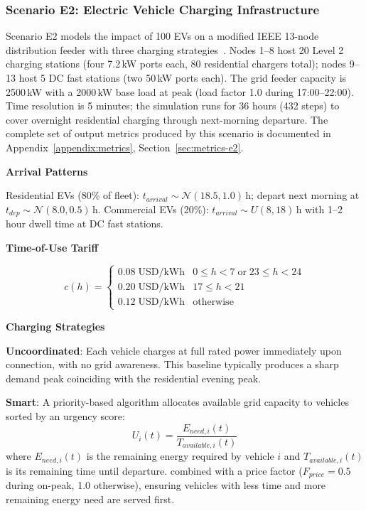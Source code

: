 \subsubsection{Scenario E2: Electric Vehicle Charging Infrastructure}
\label{sec:scenario-e2}

Scenario E2 models the impact of 100 EVs on a modified IEEE 13-node distribution feeder with three charging strategies~\cite{der_challenges}. Nodes 1--8 host 20 Level 2 charging stations (four 7.2\,kW ports each, 80 residential chargers total); nodes 9--13 host 5 DC fast stations (two 50\,kW ports each). The grid feeder capacity is 2500\,kW with a 2000\,kW base load at peak (load factor 1.0 during 17:00--22:00). Time resolution is 5 minutes; the simulation runs for 36 hours (432 steps) to cover overnight residential charging through next-morning departure. The complete set of output metrics produced by this scenario is documented in Appendix~\ref{appendix:metrics}, Section~\ref{sec:metrics-e2}.

\medskip\noindent\textbf{Arrival Patterns}

Residential EVs (80\% of fleet): $t_{arrival} \sim \mathcal{N}(18.5, 1.0)\,\text{h}$; depart next morning at $t_{dep} \sim \mathcal{N}(8.0, 0.5)\,\text{h}$. Commercial EVs (20\%): $t_{arrival} \sim U(8,18)\,\text{h}$ with 1--2 hour dwell time at DC fast stations.

\medskip\noindent\textbf{Time-of-Use Tariff}

\begin{equation}
c(h) = \begin{cases}
0.08\;\text{USD/kWh} & 0 \leq h < 7 \;\text{or}\; 23 \leq h < 24 \\
0.20\;\text{USD/kWh} & 17 \leq h < 21 \\
0.12\;\text{USD/kWh} & \text{otherwise}
\end{cases}
\label{eq:tou}
\end{equation}

\medskip\noindent\textbf{Charging Strategies}

\textbf{Uncoordinated}: Each vehicle charges at full rated power immediately upon connection, with no grid awareness. This baseline typically produces a sharp demand peak coinciding with the residential evening peak.

\textbf{Smart}: A priority-based algorithm allocates available grid capacity to vehicles sorted by an urgency score:
\begin{equation}
U_i(t) = \frac{E_{need,i}(t)}{T_{available,i}(t)}
\label{eq:urgency}
\end{equation}
where $E_{need,i}(t)$ is the remaining energy required by vehicle $i$ and $T_{available,i}(t)$ is its remaining time until departure.
combined with a price factor ($F_{price} = 0.5$ during on-peak, 1.0 otherwise), ensuring vehicles with less time and more remaining energy need are served first.

